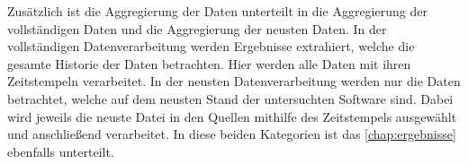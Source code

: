 Zusätzlich ist die Aggregierung der Daten unterteilt in die Aggregierung der vollständigen Daten und die Aggregierung der neusten Daten.
In der vollständigen Datenverarbeitung werden Ergebnisse extrahiert, welche die gesamte Historie der Daten betrachten.
Hier werden alle Daten mit ihren Zeitstempeln verarbeitet.
In der neusten Datenverarbeitung werden nur die Daten betrachtet, welche auf dem neusten Stand der untersuchten Software sind.
Dabei wird jeweils die neuste Datei in den Quellen mithilfe des Zeitstempels ausgewählt und anschließend verarbeitet.
In diese beiden Kategorien ist das \autoref{chap:ergebnisse} ebenfalls unterteilt.
